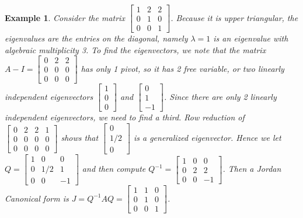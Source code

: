 \documentclass[10pt]{article}
\theoremstyle{plain}
\theoremstyle{box}
\newtheorem{example}{Example}
\begin{document}
\begin{example}
Consider the matrix 
$ \begin{bmatrix} 
1&2&2\\
0&1&0\\
0&0&1
\end{bmatrix} 
$.  Because it is upper triangular, the eigenvalues are the entries on the diagonal, namely $\lambda = 1$ is an eigenvalue with algebraic multiplicity 3. To find the eigenvectors, we note that the matrix 
$A-I= \begin{bmatrix} 
0&2&2\\
0&0&0\\
0&0&0
\end{bmatrix} 
$
has only 1 pivot, so it has 2 free variable, or two linearly independent eigenvectors 
$\begin{bmatrix} 
1\\
0\\
0
\end{bmatrix}$ 
and
$\begin{bmatrix} 
0\\
1\\
-1
\end{bmatrix}$. 
Since there are only 2 linearly independent eigenvectors, we need to find a third.  Row reduction of $\begin{bmatrix} 
0&2&2&1\\
0&0&0&0\\
0&0&0&0
\end{bmatrix}$ 
shows that  
$\begin{bmatrix} 
0\\
1/2\\
0
\end{bmatrix}$ is a generalized eigenvector.  Hence we let $Q=\begin{bmatrix} 
1&0&0\\
0&1/2&1\\
0&0&-1
\end{bmatrix} 
$ and then compute $Q^{-1} = \begin{bmatrix} 
1&0&0\\
0&2&2\\
0&0&-1
\end{bmatrix} 
$. 
Then a Jordan Canonical form is $J=Q^{-1}AQ=\begin{bmatrix} 
1&1&0\\
0&1&0\\
0&0&1
\end{bmatrix} 
$. 

\end{example}
\end{document}
